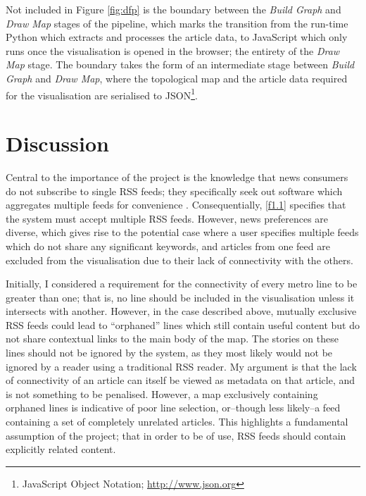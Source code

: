 Not included in Figure \ref{fig:dfp} is the boundary between the \textit{Build Graph} and \textit{Draw Map} stages of the pipeline, which marks the transition from the run-time Python which extracts and processes the article data, to JavaScript which only runs once the visualisation is opened in the browser; the entirety of the  \textit{Draw Map} stage. The boundary takes the form of an intermediate stage between \textit{Build Graph} and \textit{Draw Map}, where the topological map and the article data required for the visualisation are serialised to JSON\footnote{JavaScript Object Notation; \url{http://www.json.org}}.

\section{Discussion}

Central to the importance of the project is the knowledge that news consumers do not subscribe to single RSS feeds; they specifically seek out software which aggregates multiple feeds for convenience \citep{Nreader}. Consequentially, \ref{f1.1} specifies that the system must accept multiple RSS feeds. However, news preferences are diverse, which gives rise to the potential case where a user specifies multiple feeds which do not share any significant keywords, and articles from one feed are excluded from the visualisation due to their lack of connectivity with the others. 

Initially, I considered a requirement for the connectivity \citep{GeneratingInformationMaps} of every metro line to be greater than one; that is, no line should be included in the visualisation unless it intersects with another. However, in the case described above, mutually exclusive RSS feeds could lead to ``orphaned'' lines which still contain useful content but do not share contextual links to the main body of the map. The stories on these lines should not be ignored by the system, as they most likely would not be ignored by a reader using a traditional RSS reader. My argument is that the lack of connectivity of an article can itself be viewed as metadata on that article, and is not something to be penalised. However, a map exclusively containing orphaned lines is indicative of poor line selection, or--though less likely--a feed containing a set of completely unrelated articles. This highlights a fundamental assumption of the project; that in order to be of use, RSS feeds should contain explicitly related content.


